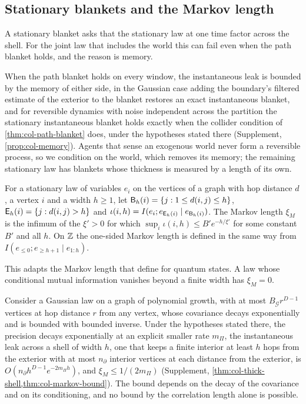 \subsection{Stationary blankets and the Markov length}\label{sec:col-markov}

A stationary blanket asks that the stationary law at one time factor across the shell. For the joint law that includes the world this can fail even when the path blanket holds, and the reason is memory.

When the path blanket holds on every window, the instantaneous leak is bounded by the memory of either side, in the Gaussian case adding the boundary's filtered estimate of the exterior to the blanket restores an exact instantaneous blanket, and for reversible dynamics with noise independent across the partition the stationary instantaneous blanket holds exactly when the collider condition of \cref{thm:col-path-blanket} does, under the hypotheses stated there (Supplement, \cref{prop:col-memory}). Agents that sense an exogenous world never form a reversible process, so we condition on the world, which removes its memory; the remaining stationary law has blankets whose thickness is measured by a length of its own.

\begin{definition}\label{def:col-markov-length}
For a stationary law of variables $e_i$ on the vertices of a graph with hop distance $d$, a vertex $i$ and a width $h\ge1$, let $\mathsf{B}_h(i)=\{j:1\le d(i,j)\le h\}$, $\mathsf{E}_h(i)=\{j:d(i,j)>h\}$ and $\iota(i,h)=I(e_i;e_{\mathsf{E}_h(i)}\mid e_{\mathsf{B}_h(i)})$. The Markov length $\xi_M$ is the infimum of the $\xi'>0$ for which $\sup_i\iota(i,h)\le B'e^{-h/\xi'}$ for some constant $B'$ and all $h$. On $\mathbb{Z}$ the one-sided Markov length is defined in the same way from $I(e_{\le0};e_{\ge h+1}\mid e_{1:h})$.
\end{definition}
This adapts the Markov length that \citet{sang2025stability} define for quantum states. A law whose conditional mutual information vanishes beyond a finite width has $\xi_M=0$.

Consider a Gaussian law on a graph of polynomial growth, with at most $B_{\mathcal G}r^{D-1}$ vertices at hop distance $r$ from any vertex, whose covariance decays exponentially and is bounded with bounded inverse. Under the hypotheses stated there, the precision decays exponentially at an explicit smaller rate $m_\Pi$, the instantaneous leak across a shell of width $h$, one that keeps a finite interior at least $h$ hops from the exterior with at most $n_\partial$ interior vertices at each distance from the exterior, is $O(n_\partial h^{D-1}e^{-2m_\Pi h})$, and $\xi_M\le1/(2m_\Pi)$ (Supplement, \cref{thm:col-thick-shell,thm:col-markov-bound}). The bound depends on the decay of the covariance and on its conditioning, and no bound by the correlation length alone is possible.

